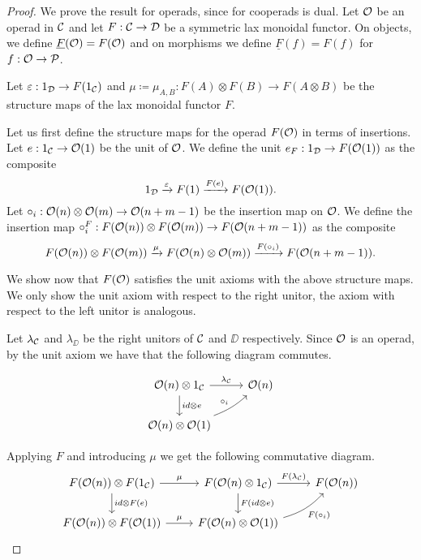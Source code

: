 \documentclass[Thesis.tex]{subfiles}
\begin{document}
\begin{proof}
We prove the result for operads, since for cooperads is dual. Let ${\mathcal O}$ be an operad in ${\mathcal C}$ and let $F:{\mathcal C}\to{\mathcal D}$ be a symmetric lax monoidal functor. On objects, we define $\underline{F}({\mathcal O})= F({\mathcal O})$ and on morphisms we define $\underline{F}(f)=F(f)$ for $f:{\mathcal O}\to\mathcal{P}$. 

Let $\varepsilon: 1_{\mathcal D}\to F(1_{\mathcal C})$ and $\mu\coloneqq\mu_{A,B}: F(A)\otimes F(B)\to F(A\otimes B)$ be the structure maps of the lax monoidal functor $F$. 

Let us first define the structure maps for the operad $F({\mathcal O})$ in terms of insertions. Let $e:1_{\mathcal C}\to{\mathcal O}(1)$ be the unit of ${\mathcal O}$. We define the unit $e_F:1_{\mathcal D}\to F({\mathcal O}(1))$ as the composite
\[1_{\mathcal D}\xrightarrow{\varepsilon} F(1)\xrightarrow{F(e)} F({\mathcal O}(1)).\]
Let $\circ_i :{\mathcal O}(n)\otimes{\mathcal O}(m)\to{\mathcal O}(n+m-1)$ be the insertion map on ${\mathcal O}$. We define the insertion map $\circ_i^F:F({\mathcal O}(n))\otimes F({\mathcal O}(m))\to F({\mathcal O}(n+m-1))$ as the composite
\[F({\mathcal O}(n))\otimes F({\mathcal O}(m))\xrightarrow{\mu} F({\mathcal O}(n)\otimes{\mathcal O}(m))\xrightarrow{F(\circ_i)} F({\mathcal O}(n+m-1)).\]

We show now that $F({\mathcal O})$ satisfies the unit axioms with the above structure maps. We only show the unit axiom with respect to the right unitor, the axiom with respect to the left unitor is analogous.


 Let $\lambda_{\mathcal C}$ and $\lambda_\DD$ be the right unitors of ${\mathcal C}$ and $\DD$ respectively. Since ${\mathcal O}$ is an operad, by the unit axiom we have that the following diagram commutes.
 
  \[
 \begin{tikzcd}
 \OO(n)\otimes 1_\CC\arrow[r, "\lambda_\CC"]\arrow[d, "id\otimes e"] &  \OO(n) \\
 \OO(n)\otimes \OO(1)\arrow[ur, bend right = 10, "\circ_i"]&
 \end{tikzcd}
 \]
 
Applying $F$ and introducing $\mu$ we get the following commutative diagram.
\begin{equation}\label{unitaux}
\begin{tikzcd}
F(\OO(n))\otimes F(1_\CC)\arrow[r,"\mu"]\arrow[d, "id\otimes F(e)"] & F(\OO(n)\otimes 1_\CC)\arrow[r, "F(\lambda_\CC)"]\arrow[d, "F(id\otimes e)"]&
F(\OO(n))\\
F(\OO(n))\otimes F(\OO(1))\arrow[r,"\mu"] & F(\OO(n)\otimes \OO(1))\arrow[ur, bend right = 15, "F(\circ_i)"']
\end{tikzcd}
\end{equation}


\end{proof}
\end{document}
